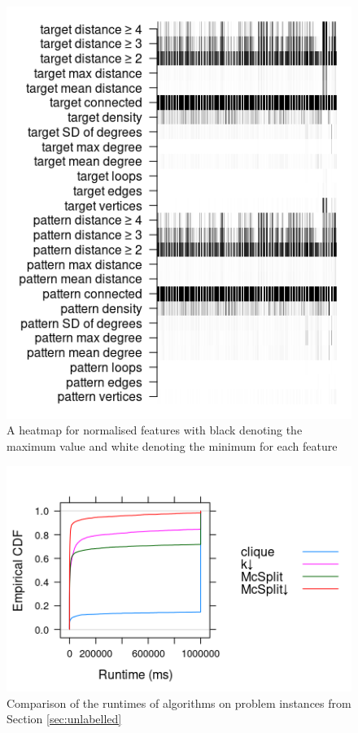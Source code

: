 \documentclass{l4proj}
\theoremstyle{definition}
\theoremstyle{remark}
\begin{document}
\begin{figure}
  \centering
  \includegraphics{images/features_heatmap.png}
  \caption{A heatmap for normalised features with black denoting the maximum
    value and white denoting the minimum for each feature}
  \label{fig:features_heatmap}
\end{figure}


\begin{figure}
  \centering
  \includegraphics{images/ecdf_sip.png}
  \caption{Comparison of the runtimes of algorithms on problem instances from
    Section \ref{sec:unlabelled}}
  \label{fig:ecdf_sip}
\end{figure}
\end{document}
